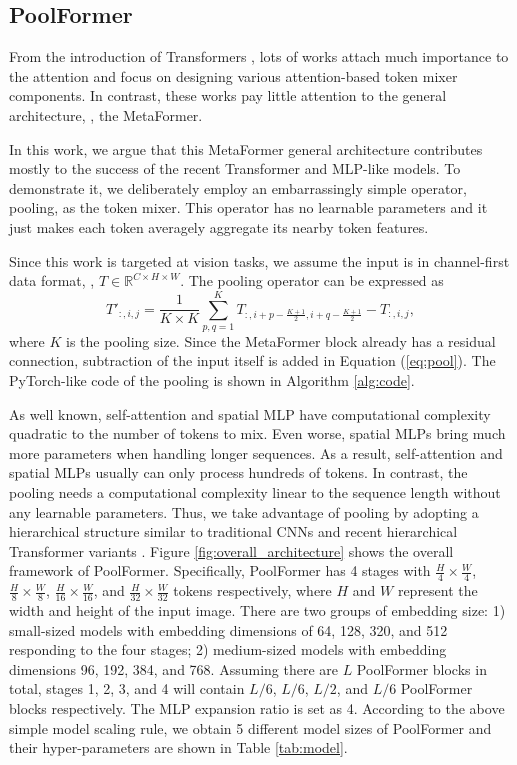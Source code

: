 \subsection{PoolFormer}
From the introduction of Transformers \cite{transformer}, lots of works attach much importance to the attention and focus on designing various attention-based token mixer components. In contrast, these works pay little attention to the general architecture, \ie, the MetaFormer.


In this work, we argue that this MetaFormer general architecture contributes mostly to the success of the recent Transformer and MLP-like models. 
To demonstrate it, we deliberately employ an embarrassingly simple operator, pooling, as the token mixer. This operator has no learnable parameters and it just makes each token averagely aggregate its nearby token features. 


Since this work is targeted at vision tasks,  we assume the input is in channel-first data format, \ie,  $T \in \mathbb{R}^{C \times H \times W}$. The pooling operator can be expressed as
\begin{equation}
\label{eq:pool}
    T'_{:, i, j} =  \frac{1}{K \times K} \sum_{p,q=1}^{K}T_{:, i+p-\frac{K+1}{2}, i+q-\frac{K+1}{2}} - T_{:, i, j},
\end{equation}
where $K$ is the pooling size. Since the MetaFormer block already has a residual connection, subtraction of the input itself is added in Equation (\ref{eq:pool}). The PyTorch-like code of the pooling is shown in Algorithm \ref{alg:code}.


As well known, self-attention and spatial MLP have computational complexity quadratic to the number of tokens to mix. Even worse, spatial MLPs bring much more parameters when handling longer sequences. As a result, self-attention and spatial MLPs usually can only process hundreds of tokens. In contrast, the pooling needs a computational complexity linear to the sequence length without any learnable parameters.  Thus, we take advantage of pooling by adopting a hierarchical structure similar to traditional CNNs \cite{alexnet, vgg, resnet} and recent hierarchical Transformer variants \cite{swin, pvt}. Figure \ref{fig:overall_architecture} shows the overall framework of PoolFormer. Specifically, PoolFormer has 4 stages with $\frac{H}{4} \times \frac{W}{4}$, $\frac{H}{8} \times \frac{W}{8}$, $\frac{H}{16} \times \frac{W}{16}$, and $\frac{H}{32} \times \frac{W}{32}$ tokens respectively, where $H$ and $W$ represent the width and height of the input image. There are two groups of embedding size: 1) small-sized models with embedding dimensions of 64, 128, 320, and 512 responding to the four stages; 2) medium-sized models with embedding dimensions 96, 192, 384, and 768. Assuming there are $L$ PoolFormer blocks in total, stages 1, 2, 3, and 4 will contain $L/6$, $L/6$, $L/2$, and $L/6$ PoolFormer blocks respectively. The MLP expansion ratio is set as 4. According to the above simple model scaling rule, we obtain 5 different model sizes of PoolFormer and their hyper-parameters are shown in Table \ref{tab:model}.


